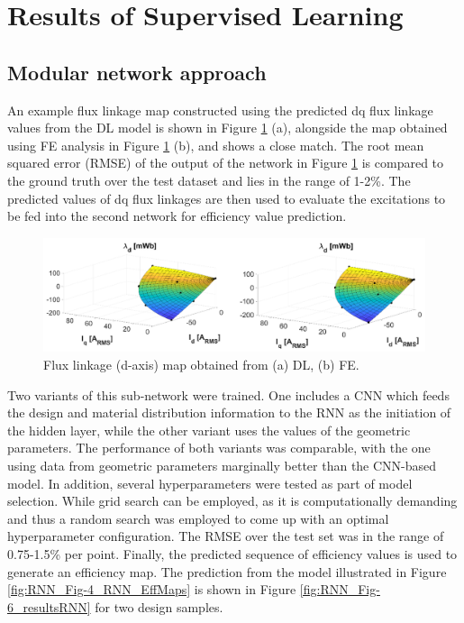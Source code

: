 \section{Results of Supervised Learning}\label{RNN:5_Results_Discussion}

\subsection{Modular network approach}\label{sec:RNN_modular_results}
An example flux linkage map constructed using the predicted dq flux linkage values from the DL model is shown in Figure \ref{fig:RNN_Fig-5_resultsFluxLinkage} (a), alongside the map obtained using FE analysis in Figure \ref{fig:RNN_Fig-5_resultsFluxLinkage} (b), and shows a close match. The root mean squared error (RMSE) of the output of the network in Figure \ref{fig:RNN_Fig-5_resultsFluxLinkage} is compared to the ground truth over the test dataset and lies in the range of 1-2\%. The predicted values of dq flux linkages are then used to evaluate the excitations to be fed into the second network for efficiency value prediction. 

\begin{figure}[h!]
    \centering
    \includegraphics[width=\textwidth]{Figures/Chp_RNN/Fig 5.png}
    \caption{Flux linkage (d-axis) map obtained from (a) DL, (b) FE.}
    \label{fig:RNN_Fig-5_resultsFluxLinkage}
\end{figure}

Two variants of this sub-network were trained. One includes a CNN which feeds the design and material distribution information to the RNN as the initiation of the hidden layer, while the other variant uses the values of the geometric parameters. The performance of both variants was comparable, with the one using data from geometric parameters marginally better than the CNN-based model. In addition, several hyperparameters were tested as part of model selection. While grid search can be employed, as it is computationally demanding and thus a random search was employed to come up with an optimal hyperparameter configuration.  The RMSE over the test set was in the range of 0.75-1.5\% per point. Finally, the predicted sequence of efficiency values is used to generate an efficiency map. The prediction from the model illustrated in Figure \ref{fig:RNN_Fig-4_RNN_EffMaps} is shown in Figure \ref{fig:RNN_Fig-6_resultsRNN} for two design samples. 

